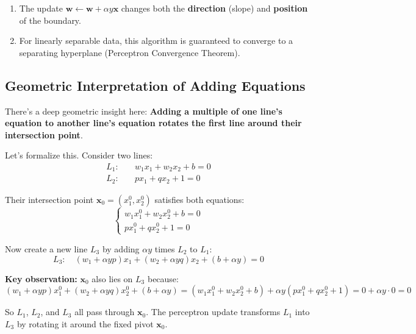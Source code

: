 \begin{notechapter}
\begin{enumerate}
    \item The update $\mathbf{w} \leftarrow \mathbf{w} + \alpha y \mathbf{x}$ changes both the \textbf{direction} (slope) and \textbf{position} of the boundary.
    
    \item For linearly separable data, this algorithm is guaranteed to converge to a separating hyperplane (Perceptron Convergence Theorem).
\end{enumerate}



\subsection{Geometric Interpretation of Adding Equations}

There's a deep geometric insight here: \textbf{Adding a multiple of one line's equation to another line's equation rotates the first line around their intersection point}.

Let's formalize this. Consider two lines:
\[
\begin{aligned}
L_1:& \quad w_1 x_1 + w_2 x_2 + b = 0 \\
L_2:& \quad p x_1 + q x_2 + 1 = 0
\end{aligned}
\]

Their intersection point $\mathbf{x}_0 = (x_1^0, x_2^0)$ satisfies both equations:
\[
\begin{cases}
w_1 x_1^0 + w_2 x_2^0 + b = 0 \\
p x_1^0 + q x_2^0 + 1 = 0
\end{cases}
\]

Now create a new line $L_3$ by adding $\alpha y$ times $L_2$ to $L_1$:
\[
L_3: \quad (w_1 + \alpha y p)x_1 + (w_2 + \alpha y q)x_2 + (b + \alpha y) = 0
\]

\textbf{Key observation:} $\mathbf{x}_0$ also lies on $L_3$ because:
\[
(w_1 + \alpha y p)x_1^0 + (w_2 + \alpha y q)x_2^0 + (b + \alpha y)
= (w_1 x_1^0 + w_2 x_2^0 + b) + \alpha y (p x_1^0 + q x_2^0 + 1) = 0 + \alpha y \cdot 0 = 0
\]

So $L_1$, $L_2$, and $L_3$ all pass through $\mathbf{x}_0$. The perceptron update transforms $L_1$ into $L_3$ by rotating it around the fixed pivot $\mathbf{x}_0$.

\begin{figure}[H]
\centering
{}
\end{figure}
\end{notechapter}

